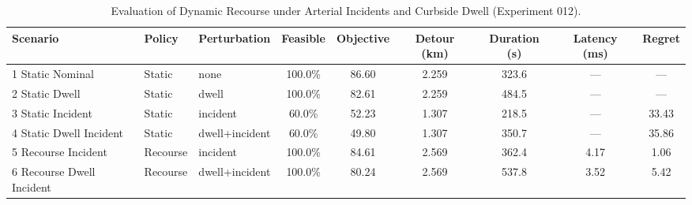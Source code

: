 \begin{table}[t]
\centering
\small
\caption{Evaluation of Dynamic Recourse under Arterial Incidents and Curbside Dwell (Experiment 012).}
\label{tab:recourse_outcomes}
\begin{tabular}{l l l c c c c c c}
\toprule
\textbf{Scenario} & \textbf{Policy} & \textbf{Perturbation} & \textbf{Feasible} & \textbf{Objective} & \textbf{Detour (km)} & \textbf{Duration (s)} & \textbf{Latency (ms)} & \textbf{Regret} \\
\midrule
1 Static Nominal & Static & none & 100.0\% & 86.60 & 2.259 & 323.6 & --- & --- \\
2 Static Dwell & Static & dwell & 100.0\% & 82.61 & 2.259 & 484.5 & --- & --- \\
3 Static Incident & Static & incident & 60.0\% & 52.23 & 1.307 & 218.5 & --- & 33.43 \\
4 Static Dwell Incident & Static & dwell+incident & 60.0\% & 49.80 & 1.307 & 350.7 & --- & 35.86 \\
5 Recourse Incident & Recourse & incident & 100.0\% & 84.61 & 2.569 & 362.4 & 4.17 & 1.06 \\
6 Recourse Dwell Incident & Recourse & dwell+incident & 100.0\% & 80.24 & 2.569 & 537.8 & 3.52 & 5.42 \\
\bottomrule
\end{tabular}
\end{table}
